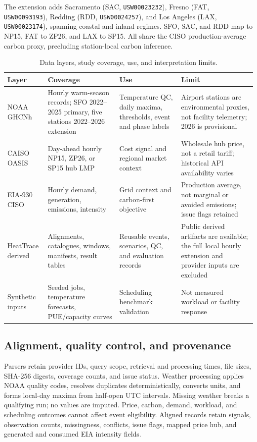 \documentclass[pdflatex,sn-mathphys-num]{sn-jnl}
\begin{document}
The extension adds Sacramento (SAC, \texttt{USW00023232}), Fresno (FAT, \texttt{USW00093193}), Redding (RDD, \texttt{USW00024257}), and Los Angeles (LAX, \texttt{USW00023174}), spanning coastal and inland regimes. SFO, SAC, and RDD map to NP15, FAT to ZP26, and LAX to SP15. All share the CISO production-average carbon proxy, precluding station-local carbon inference.

\begin{table}[t]
\caption{Data layers, study coverage, use, and interpretation limits.}
\label{tab:sources}
\small
\begin{tabular}{@{}p{}p{}p{}p{}@{}}
\toprule
\textbf{Layer} & \textbf{Coverage} & \textbf{Use} & \textbf{Limit} \\
\midrule
NOAA GHCNh & Hourly warm-season records; SFO 2022--2025 primary, five stations 2022--2026 extension & Temperature QC, daily maxima, thresholds, event and phase labels & Airport stations are environmental proxies, not facility telemetry; 2026 is provisional \\
CAISO OASIS & Day-ahead hourly NP15, ZP26, or SP15 hub LMP & Cost signal and regional market context & Wholesale hub price, not a retail tariff; historical API availability varies \\
EIA-930 CISO & Hourly demand, generation, emissions, intensity & Grid context and carbon-first objective & Production average, not marginal or avoided emissions; issue flags retained \\
HeatTrace derived & Alignments, catalogues, windows, manifests, result tables & Reusable events, scenarios, QC, and evaluation records & Public derived artifacts are available; the full local hourly extension and provider inputs are excluded \\
Synthetic inputs & Seeded jobs, temperature forecasts, PUE/capacity curves & Scheduling benchmark validation & Not measured workload or facility response \\
\bottomrule
\end{tabular}
\end{table}

\subsection{Alignment, quality control, and provenance}

Parsers retain provider IDs, query scope, retrieval and processing times, file sizes, SHA-256 digests, coverage counts, and issue status. Weather processing applies NOAA quality codes, resolves duplicates deterministically, converts units, and forms local-day maxima from half-open UTC intervals. Missing weather breaks a qualifying run; no values are imputed. Price, carbon, demand, workload, and scheduling outcomes cannot affect event eligibility. Aligned records retain signals, observation counts, missingness, conflicts, issue flags, mapped price hub, and generated and consumed EIA intensity fields.
\end{document}
